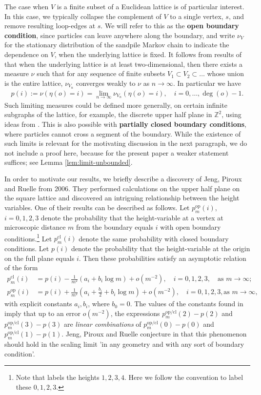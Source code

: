 \documentclass[11pt]{article}
\theoremstyle{remark}
\def\Z{\mathbb{Z}}
\def\pop{p^{\mathrm{op}}}
\def\pcl{p^{\mathrm{cl}}}
\newcommand{\eqnspl}[2]{\begin{equation}\begin{split}\label{#1}%
   #2\end{split}\end{equation}}
\newcommand{\eqnsplst}[1]{\begin{equation*}\begin{split}%
   #1\end{split}\end{equation*}}
\begin{document}
The case when $V$ is a finite subset of a Euclidean lattice is of particular interest. In this case, 
we typically collapse the complement of $V$ to a single vertex, $s$, and remove resulting loop-edges 
at $s$. We will refer to this as the \textbf{open boundary condition}, since particles can leave anywhere 
along the boundary, and write $\nu_V$ for the stationary 
distribution of the sandpile Markov chain to indicate the dependence on $V$, when the underlying lattice 
is fixed. It follows from results of \cite{AJ04,Jarai2014minimal} that when the underlying lattice is at least 
two-dimensional, then there exists a measure $\nu$ such that for any sequence of finite subsets
$V_1 \subset V_2 \subset \dots$ whose union is the entire lattice, $\nu_{V_n}$ converges weakly to
$\nu$ as $n \to \infty$. In particular we have 
\eqnsplst
{ p(i) 
  := \nu( \eta(o) = i )
  = \lim_{n \to \infty} \nu_{V_n} ( \eta(o) = i ), \quad i = 0, \dots, \deg(o)-1. }
Such limiting measures could be defined more generally, on certain infinite subgraphs 
of the lattice, for example, the discrete upper half plane in $\Z^2$, using ideas from
\cite{AJ04,Jarai2014minimal}. This is also possible with 
\textbf{partially closed boundary conditions}, where particles cannot cross a segment
of the boundary. While the existence of such limits is relevant for the motivating 
discussion in the next paragraph, we do not include a proof here, because for the 
present paper a weaker statement suffices; see Lemma \ref{lem:limit-unbounded}.

In order to motivate our results, we briefly describe a discovery of Jeng, Piroux and Ruelle \cite{JPR06}
from 2006. They performed calculations on the upper half plane on the 
square lattice and discovered an intriguing relationship between the height variables. One of their 
results can be described as follows. Let $\pop_m(i)$, $i=0,1,2,3$ denote the probability 
that the height-variable at a vertex at microscopic distance $m$ from the boundary 
equals $i$ with open boundary conditions.\footnote{Note that \cite{JPR06} labels the 
heights $1,2,3,4$. Here we follow the convention to label these $0,1,2,3$.} 
Let $\pcl_m(i)$ denote the same probability with closed boundary conditions.
Let $p(i)$ denote the probability that the height-variable at the origin 
on the full plane equals $i$. Then these probabilities satisfy an asymptotic relation of the form
\eqnspl{e:JPR-rel}
{ \pcl_m(i) 
	&= p(i) - \frac{1}{m^2} \left( a_i + b_i \log m \right) + o(m^{-2}), 
    \quad i = 0, 1, 2, 3, \quad \text{as $m \to \infty$}; \\
	\pop_m(i) 
	&= p(i) + \frac{1}{m^2} \left( a_i + \frac{b_i}{2} + b_i \log m \right) + o(m^{-2}), 
      \quad i = 0, 1, 2, 3, \text{as $m \to \infty$}, }
with explicit constants $a_i, b_i$, where $b_0 = 0$.
The values of the constants found in \cite{JPR06} imply that up to an error $o(m^{-2})$, the expressions 
$p^{\mathrm{op/cl}}_m(2) - p(2)$ and $p^{\mathrm{op/cl}}_m(3) - p(3)$ are \emph{linear combinations} of
$p^{\mathrm{op/cl}}_m(0) - p(0)$ and $p^{\mathrm{op/cl}}_m(1) - p(1)$.
Jeng, Piroux and Ruelle conjecture in \cite{JPR06} that this phenomenon
should hold in the scaling limit 'in any geometry and with any sort of boundary condition'.
\end{document}
